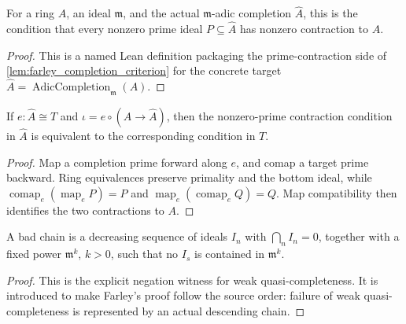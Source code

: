 \begin{definition}
  \label{def:adic_completion_prime_contraction_condition}
  For a ring \(A\), an ideal \(\mathfrak m\), and the actual
  \(\mathfrak m\)-adic completion \(\widehat A\), this is the condition that
  every nonzero prime ideal \(P\subseteq\widehat A\) has nonzero contraction
  to \(A\).
\end{definition}

\begin{proof}
  This is a named Lean definition packaging the prime-contraction side of
  \cref{lem:farley_completion_criterion} for the concrete target
  \(\widehat A=\operatorname{AdicCompletion}_{\mathfrak m}(A)\).
\end{proof}

\begin{lemma}
  \label{lem:adic_completion_prime_contraction_condition_iff_target}
  If \(e:\widehat A\cong T\) and
  \(\iota=e\circ(A\to\widehat A)\), then the nonzero-prime contraction
  condition in \(\widehat A\) is equivalent to the corresponding condition in
  \(T\).
\end{lemma}

\begin{proof}
  Map a completion prime forward along \(e\), and comap a target prime
  backward.  Ring equivalences preserve primality and the bottom ideal, while
  \(\operatorname{comap}_e(\operatorname{map}_e P)=P\) and
  \(\operatorname{map}_e(\operatorname{comap}_e Q)=Q\).  Map compatibility
  then identifies the two contractions to \(A\).
\end{proof}

\begin{definition}
  \label{def:weakly_quasi_complete_bad_chain}
  A bad chain is a decreasing sequence of ideals \(I_n\) with
  \(\bigcap_n I_n=0\), together with a fixed power \(\mathfrak m^k\), \(k>0\),
  such that no \(I_s\) is contained in \(\mathfrak m^k\).
\end{definition}

\begin{proof}
  This is the explicit negation witness for weak quasi-completeness.  It is
  introduced to make Farley's proof follow the source order: failure of weak
  quasi-completeness is represented by an actual descending chain.
\end{proof}


